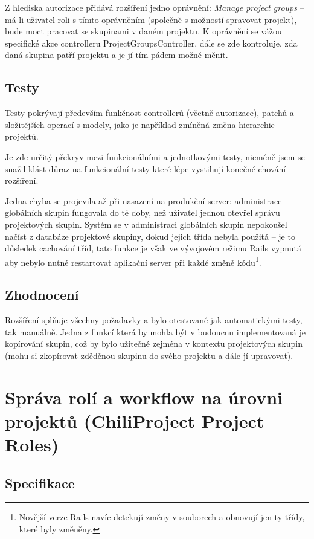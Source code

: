 \documentclass[thesis=B,czech]{FITthesis}[2012/05/02]
\begin{document}
Z hlediska autorizace přidává rozšíření jedno oprávnění: \emph{Manage
project groups} -- má-li uživatel roli s tímto oprávněním (společně s
možností spravovat projekt), bude moct pracovat se skupinami v daném
projektu. K oprávnění se vážou specifické akce controlleru
ProjectGroupsController, dále se zde kontroluje, zda daná skupina patří
projektu a je jí tím pádem možné měnit.

\subsection{Testy}

Testy pokrývají především funkčnost controllerů (včetně autorizace),
patchů a složitějších operací s modely, jako je například zmíněná změna
hierarchie projektů.

Je zde určitý překryv mezi funkcionálními a jednotkovými testy, nicméně
jsem se snažil klást důraz na funkcionální testy které lépe vystihují
konečné chování rozšíření.

Jedna chyba se projevila až při nasazení na produkční server:
administrace globálních skupin fungovala do té doby, než uživatel jednou
otevřel správu projektových skupin. Systém se v administraci globálních
skupin nepokoušel načíst z databáze projektové skupiny, dokud jejich
třída nebyla použitá -- je to důsledek cachování tříd, tato funkce je
však ve vývojovém režimu Rails vypnutá aby nebylo nutné restartovat
aplikační server při každé změně kódu\footnote{Novější verze Rails navíc
  detekují změny v souborech a obnovují jen ty třídy, které byly
  změněny.}.

\subsection{Zhodnocení}

Rozšíření splňuje všechny požadavky a bylo otestované jak automatickými
testy, tak manuálně. Jedna z funkcí která by mohla být v budoucnu
implementovaná je kopírování skupin, což by bylo užitečné zejména v
kontextu projektových skupin (mohu si zkopírovat zděděnou skupinu do
svého projektu a dále jí upravovat).

\section{Správa rolí a workflow na úrovni projektů (ChiliProject Project
Roles)}
\label{sec:project_roles}

\subsection{Specifikace}
\end{document}

